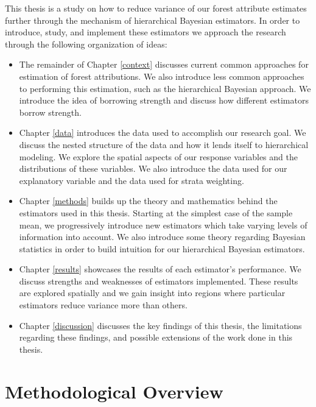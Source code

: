 \documentclass[12pt,twoside]{reedthesis}
\providecommand{\tightlist}{%
  \setlength{\itemsep}{0pt}\setlength{\parskip}{0pt}}
\begin{document}
This thesis is a study on how to reduce variance of our forest attribute estimates further through the mechanism of hierarchical Bayesian estimators. In order to introduce, study, and implement these estimators we approach the research through the following organization of ideas:
\begin{itemize}
\tightlist
\item
  The remainder of Chapter \ref{context} discusses current common approaches for estimation of forest attributions. We also introduce less common approaches to performing this estimation, such as the hierarchical Bayesian approach. We introduce the idea of borrowing strength and discuss how different estimators borrow strength.
\item
  Chapter \ref{data} introduces the data used to accomplish our research goal. We discuss the nested structure of the data and how it lends itself to hierarchical modeling. We explore the spatial aspects of our response variables and the distributions of these variables. We also introduce the data used for our explanatory variable and the data used for strata weighting.
\item
  Chapter \ref{methods} builds up the theory and mathematics behind the estimators used in this thesis. Starting at the simplest case of the sample mean, we progressively introduce new estimators which take varying levels of information into account. We also introduce some theory regarding Bayesian statistics in order to build intuition for our hierarchical Bayesian estimators.
\item
  Chapter \ref{results} showcases the results of each estimator's performance. We discuss strengths and weaknesses of estimators implemented. These results are explored spatially and we gain insight into regions where particular estimators reduce variance more than others.
\item
  Chapter \ref{discussion} discusses the key findings of this thesis, the limitations regarding these findings, and possible extensions of the work done in this thesis.
\end{itemize}
\hypertarget{methodological-overview}{%
\section{Methodological Overview}\label{methodological-overview}}
\end{document}

